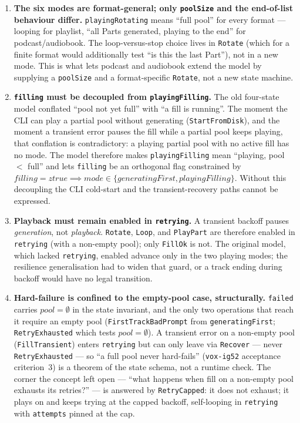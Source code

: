 \documentclass[a4paper,10pt,fleqn]{article}
\begin{document}
\begin{enumerate}
  \item \textbf{The six modes are format-general; only \texttt{poolSize} and
    the end-of-list behaviour differ.} \texttt{playingRotating} means ``full
    pool'' for every format --- looping for playlist, ``all Parts generated,
    playing to the end'' for podcast/audiobook. The loop-versus-stop choice
    lives in \texttt{Rotate} (which for a finite format would additionally test
    ``is this the last Part''), not in a new mode. This is what lets podcast and
    audiobook extend the model by supplying a \texttt{poolSize} and a
    format-specific \texttt{Rotate}, not a new state machine.

  \item \textbf{\texttt{filling} must be decoupled from \texttt{playingFilling}.}
    The old four-state model conflated ``pool not yet full'' with ``a fill is
    running''. The moment the CLI can play a partial pool without generating
    (\texttt{StartFromDisk}), and the moment a transient error pauses the fill
    while a partial pool keeps playing, that conflation is contradictory: a
    playing partial pool with no active fill has no mode. The model therefore
    makes \texttt{playingFilling} mean ``playing, pool $<$ full'' and lets
    \texttt{filling} be an orthogonal flag constrained by
    $filling = ztrue \implies mode \in \{generatingFirst, playingFilling\}$.
    Without this decoupling the CLI cold-start and the transient-recovery paths
    cannot be expressed.

  \item \textbf{Playback must remain enabled in \texttt{retrying}.} A transient
    backoff pauses \emph{generation}, not \emph{playback}. \texttt{Rotate},
    \texttt{Loop}, and \texttt{PlayPart} are therefore enabled in
    \texttt{retrying} (with a non-empty pool); only \texttt{FillOk} is not.
    The original model, which lacked \texttt{retrying}, enabled advance only in
    the two playing modes; the resilience generalisation had to widen that
    guard, or a track ending during backoff would have no legal transition.

  \item \textbf{Hard-failure is confined to the empty-pool case, structurally.}
    \texttt{failed} carries $pool = \emptyset$ in the state invariant, and the
    only two operations that reach it require an empty pool
    (\texttt{FirstTrackBadPrompt} from \texttt{generatingFirst};
    \texttt{RetryExhausted} which tests $pool = \emptyset$). A transient error
    on a non-empty pool (\texttt{FillTransient}) enters \texttt{retrying} but can
    only leave via \texttt{Recover} --- never \texttt{RetryExhausted} --- so
    ``a full pool never hard-fails'' (\texttt{vox-ig52} acceptance criterion~3)
    is a theorem of the state schema, not a runtime check. The corner the
    concept left open --- ``what happens when fill on a non-empty pool exhausts
    its retries?'' --- is answered by \texttt{RetryCapped}: it does not exhaust;
    it plays on and keeps trying at the capped backoff, self-looping in
    \texttt{retrying} with \texttt{attempts} pinned at the cap.


\end{enumerate}
\end{document}
